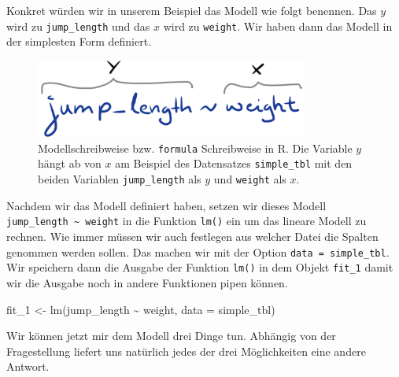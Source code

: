 \documentclass[
  letterpaper,
]{scrbook}
\newenvironment{Shaded}{\begin{snugshade}}{\end{snugshade}}
\newcommand{\AttributeTok}[1]{\textcolor[rgb]{0.40,0.45,0.13}{#1}}
\newcommand{\FunctionTok}[1]{\textcolor[rgb]{0.28,0.35,0.67}{#1}}
\newcommand{\NormalTok}[1]{\textcolor[rgb]{0.00,0.23,0.31}{#1}}
\newcommand{\OtherTok}[1]{\textcolor[rgb]{0.00,0.23,0.31}{#1}}
\newcommand{\SpecialCharTok}[1]{\textcolor[rgb]{0.37,0.37,0.37}{#1}}
\begin{document}
Konkret würden wir in unserem Beispiel das Modell wie folgt benennen.
Das \(y\) wird zu \texttt{jump\_length} und das \(x\) wird zu
\texttt{weight}. Wir haben dann das Modell in der simplesten Form
definiert.

\begin{figure}

{\centering \includegraphics[width=0.8\textwidth,height=\textheight]{./images/statistical_modeling_2.png}

}

\caption{\label{fig-lin-reg-22}Modellschreibweise bzw. \texttt{formula}
Schreibweise in R. Die Variable \(y\) hängt ab von \(x\) am Beispiel des
Datensatzes \texttt{simple\_tbl} mit den beiden Variablen
\texttt{jump\_length} als \(y\) und \texttt{weight} als \(x\).}

\end{figure}

Nachdem wir das Modell definiert haben, setzen wir dieses Modell
\texttt{jump\_length\ \textasciitilde{}\ weight} in die Funktion
\texttt{lm()} ein um das lineare Modell zu rechnen. Wie immer müssen wir
auch festlegen aus welcher Datei die Spalten genommen werden sollen. Das
machen wir mit der Option \texttt{data\ =\ simple\_tbl}. Wir speichern
dann die Ausgabe der Funktion \texttt{lm()} in dem Objekt
\texttt{fit\_1} damit wir die Ausgabe noch in andere Funktionen pipen
können.

\begin{Shaded}
\begin{Highlighting}[]
\NormalTok{fit\_1 }\OtherTok{\textless{}{-}} \FunctionTok{lm}\NormalTok{(jump\_length }\SpecialCharTok{\textasciitilde{}}\NormalTok{ weight, }\AttributeTok{data =}\NormalTok{ simple\_tbl)}
\end{Highlighting}
\end{Shaded}

{}

Wir können jetzt mir dem Modell drei Dinge tun. Abhängig von der
Fragestellung liefert uns natürlich jedes der drei Möglichkeiten eine
andere Antwort.
\end{document}
